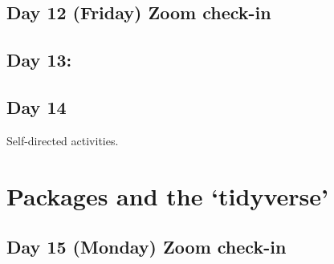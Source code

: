 \documentclass[
]{book}
\newenvironment{Shaded}{\begin{snugshade}}{\end{snugshade}}
\newcommand{\CommentTok}[1]{\textcolor[rgb]{0.56,0.35,0.01}{\textit{#1}}}
\newcommand{\KeywordTok}[1]{\textcolor[rgb]{0.13,0.29,0.53}{\textbf{#1}}}
\newcommand{\NormalTok}[1]{#1}
\newcommand{\OperatorTok}[1]{\textcolor[rgb]{0.81,0.36,0.00}{\textbf{#1}}}
\newcommand{\StringTok}[1]{\textcolor[rgb]{0.31,0.60,0.02}{#1}}
\begin{document}
\begin{itemize}
\begin{Shaded}
\end{Shaded}
\end{itemize}

\hypertarget{day-12-friday-zoom-check-in}{%
\section{Day 12 (Friday) Zoom check-in}\label{day-12-friday-zoom-check-in}}

\hypertarget{day-13}{%
\section{Day 13:}\label{day-13}}

\hypertarget{day-14}{%
\section{Day 14}\label{day-14}}

Self-directed activities.

\hypertarget{three}{%
\chapter{Packages and the `tidyverse'}\label{three}}

\hypertarget{day-15-monday-zoom-check-in}{%
\section{Day 15 (Monday) Zoom check-in}\label{day-15-monday-zoom-check-in}}
\end{document}
